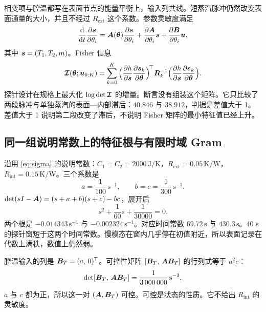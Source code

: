 相变项与腔温都写在表面节点的能量平衡上，输入列共线。短蒸汽脉冲仍然改变表面通量的大小，并且不经过 \(R_{\mathrm{ext}}\) 这个系数。参数灵敏度满足
\begin{equation}
\label{eq:sens}
\frac{\mathrm{d}}{\mathrm{d}t}\frac{\partial \bm{s}}{\partial\theta_i}
=\bm{A}(\bm{\theta})\frac{\partial \bm{s}}{\partial\theta_i}
+\frac{\partial \bm{A}}{\partial\theta_i}\bm{s}
+\frac{\partial \bm{B}}{\partial\theta_i}\bm{u},
\end{equation}
其中 \(\bm{s}=(T_1,T_2,m)\)。Fisher 信息
\begin{equation}
\label{eq:fisher}
\bm{\mathcal{I}}(\bm{\theta};\bm{u}_{0:K})
=\sum_{k=0}^{K}
\Big(\frac{\partial h}{\partial \bm{s}}\frac{\partial \bm{s}_k}{\partial\bm{\theta}}\Big)^{\!\top}
\bm{R}_k^{-1}
\Big(\frac{\partial h}{\partial \bm{s}}\frac{\partial \bm{s}_k}{\partial\bm{\theta}}\Big).
\end{equation}
探针设计在规格上最大化 \(\log\det\bm{\mathcal{I}}\) 的增量。断言没有组装这个矩阵。它只比较了两段脉冲与单独蒸汽的表面—内部滞后：\(40.846\) 与 \(38.912\)，判据是差值大于 1。差值大于 1 说明第二段改变了滞后，不说明 Fisher 矩阵的最小特征值已经上升。

\subsection{同一组说明常数上的特征根与有限时域 Gram}

沿用 \eqref{eq:sigma} 的说明常数：\(C_1=C_2=2000\,\mathrm{J/K}\)，\(R_{\mathrm{ext}}=0.05\,\mathrm{K/W}\)，\(R_{\mathrm{int}}=0.15\,\mathrm{K/W}\)。三个系数是
\[
a=\frac{1}{100}\,\mathrm{s}^{-1},\qquad
b=c=\frac{1}{300}\,\mathrm{s}^{-1}.
\]
\(\det(sI-\bm{A})=(s+a+b)(s+c)-bc\)，展开后
\begin{equation}
\label{eq:charpoly}
s^2+\frac{1}{60}s+\frac{1}{30000}=0.
\end{equation}
两个根是 \(-0.014343\,\mathrm{s}^{-1}\) 与 \(-0.002324\,\mathrm{s}^{-1}\)。对应时间常数 \(69.72\,\mathrm{s}\) 与 \(430.3\,\mathrm{s}\)。40 s 的探针窗短于这两个时间常数。慢模态在窗内几乎停在初值附近，所以表面记录在代数上满秩，数值上仍然弱。

腔温输入的列是 \(\bm{B}_T=(a,\,0)^{\mathsf T}\)。可控性矩阵 \([\bm{B}_T,\,\bm{A}\bm{B}_T]\) 的行列式等于 \(a^2 c\)：
\begin{equation}
\label{eq:ctrb}
\det[\bm{B}_T,\,\bm{A}\bm{B}_T]
=\frac{1}{3\,000\,000}\,\mathrm{s}^{-3}.
\end{equation}
\(a\) 与 \(c\) 都为正，所以这一对 \((\bm{A},\bm{B}_T)\) 可控。可控是状态的性质。它不给出 \(R_{\mathrm{int}}\) 的灵敏度。

